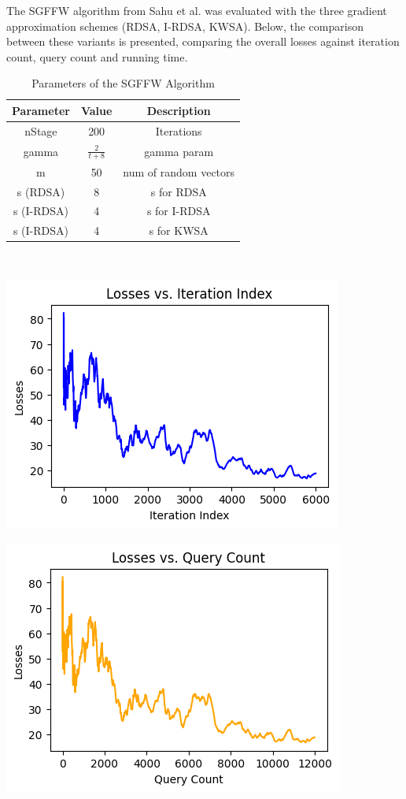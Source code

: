 \documentclass[10pt,twocolumn,letterpaper]{article}
\begin{document}
The SGFFW algorithm from Sahu et al. was evaluated with the three
gradient approximation schemes (RDSA, I-RDSA, KWSA).
Below, the comparison between these variants is presented,
comparing the overall losses against iteration count, query count and running time.


\begin{table}[h]
   \centering
   \begin{tabular}{ccc}
       \hline
       Parameter & Value & Description \\
       \hline
       nStage & 200 & Iterations\\
       \hline
       gamma & $\frac{2}{t+8}$ & gamma param \\
       \hline
       m & 50 & num of random vectors\\
       \hline
       s (RDSA) & 8 & s for RDSA\\
       s (I-RDSA) & 4 & s for I-RDSA\\
       s (I-RDSA) & 4 & s for KWSA\\
       \hline
   \end{tabular}\\
   \caption{Parameters of the SGFFW Algorithm} 
   \label{tab:sgffw_params}
\end{table}


\begin{center}
   \includegraphics*[scale=0.7]{img/RDSA_loss_vs_iterations.png}
\end{center}

\begin{center}
   \includegraphics*[scale=0.7]{img/RDSA_loss_vs_querycount.png}
\end{center}
\end{document}
